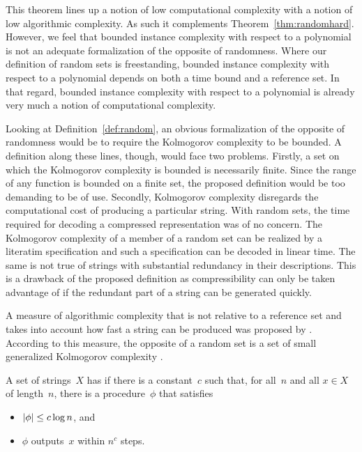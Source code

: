 This theorem lines up a notion of low computational complexity with a notion of low algorithmic complexity.
As such it complements Theorem~\ref{thm:randomhard}.
However, we feel that bounded instance complexity with respect to a polynomial is not an adequate formalization of the opposite of randomness.
Where our definition of random sets is freestanding, bounded instance complexity with respect to a polynomial depends on both a time bound and a reference set.
In that regard, bounded instance complexity with respect to a polynomial is already very much a notion of computational complexity.

Looking at Definition~\ref{def:random}, an obvious formalization of the opposite of randomness would be to require the Kolmogorov complexity to be bounded.
A definition along these lines, though, would face two problems.
Firstly, a set on which the Kolmogorov complexity is bounded is necessarily finite.
Since the range of any function is bounded on a finite set, the proposed definition would be too demanding to be of use.
Secondly, Kolmogorov complexity disregards the computational cost of producing a particular string.
With random sets, the time required for decoding a compressed representation was of no concern.
The Kolmogorov complexity of a member of a random set can be realized by a literatim specification and such a specification can be decoded in linear time.
The same is not true of strings with substantial redundancy in their descriptions.
This is a drawback of the proposed definition as compressibility can only be taken advantage of if the redundant part of a string can be generated quickly.

A measure of algorithmic complexity that is not relative to a reference set and takes into account how fast a string can be produced was proposed by \textcite{hartmanis1983generalized}.
According to this measure, the opposite of a random set is a set of small generalized Kolmogorov complexity \parencite{balcazar1986sets,allender1988p-printable}.
\begin{definition}
  A set of strings~$X$ has  if there is a constant~$c$ such that, for all~$n$ and all $x \in X$ of length~$n$, there is a procedure~$\phi$ that satisfies
  \begin{itemize}
  \item ${\lvert\phi\rvert} \le c\log n$, and
  \item $\phi$ outputs~$x$ within $n^c$ steps.
  \end{itemize}
\end{definition}


